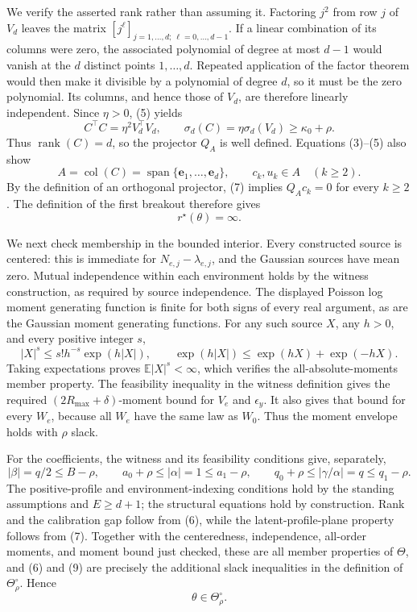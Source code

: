 We verify the asserted rank rather than assuming it.  Factoring \(j^2\) from row \(j\) of \(V_d\) leaves the matrix \([j^\ell]_{j=1,\ldots,d;\ \ell=0,\ldots,d-1}\).  If a linear combination of its columns were zero, the associated polynomial of degree at most \(d-1\) would vanish at the \(d\) distinct points \(1,\ldots,d\).  Repeated application of the factor theorem would then make it divisible by a polynomial of degree \(d\), so it must be the zero polynomial.  Its columns, and hence those of \(V_d\), are therefore linearly independent.  Since \(\eta>0\), (5) yields
\[
 C^\top C=\eta^2V_d^\top V_d,
 \qquad
 \sigma_d(C)=\eta\sigma_d(V_d)\geq\kappa_0+\rho.              \tag{6}
\]
Thus \(\operatorname{rank}(C)=d\), so the projector \(Q_A\) is well defined.  Equations (3)--(5) also show
\[
 A=\operatorname{col}(C)
  =\operatorname{span}\{\mathbf e_1,\ldots,\mathbf e_d\},
 \qquad
 c_k,u_k\in A\quad(k\geq2).                                   \tag{7}
\]
By the definition of an orthogonal projector, (7) implies \(Q_Ac_k=0\) for every \(k\geq2\).  The definition of the first breakout therefore gives
\[
 r^\star(\theta)=\infty.                                       \tag{8}
\]

We next check membership in the bounded interior.  Every constructed source is centered: this is immediate for \(N_{e,j}-\lambda_{e,j}\), and the Gaussian sources have mean zero.  Mutual independence within each environment holds by the witness construction, as required by source independence.  The displayed Poisson log moment generating function is finite for both signs of every real argument, as are the Gaussian moment generating functions.  For any such source \(X\), any \(h>0\), and every positive integer \(s\),
\[
 |X|^s\leq s!h^{-s}\exp(h|X|),
 \qquad
 \exp(h|X|)\leq\exp(hX)+\exp(-hX).
\]
Taking expectations proves \(\mathbb E|X|^s<\infty\), which verifies the all-absolute-moments member property.  The feasibility inequality in the witness definition gives the required \((2R_{\max}+\delta)\)-moment bound for \(V_e\) and \(\epsilon_y\).  It also gives that bound for every \(W_e\), because all \(W_e\) have the same law as \(W_0\).  Thus the moment envelope holds with \(\rho\) slack.

For the coefficients, the witness and its feasibility conditions give, separately,
\[
 |\beta|=q/2\leq B-\rho,
 \qquad
 a_0+\rho\leq|\alpha|=1\leq a_1-\rho,
 \qquad
 q_0+\rho\leq|\gamma/\alpha|=q\leq q_1-\rho.                  \tag{9}
\]
The positive-profile and environment-indexing conditions hold by the standing assumptions and \(E\geq d+1\); the structural equations hold by construction.  Rank and the calibration gap follow from (6), while the latent-profile-plane property follows from (7).  Together with the centeredness, independence, all-order moments, and moment bound just checked, these are all member properties of \(\Theta\), and (6) and (9) are precisely the additional slack inequalities in the definition of \(\Theta_\rho^\circ\).  Hence
\[
 \theta\in\Theta_\rho^\circ.                                \tag{10}
\]

